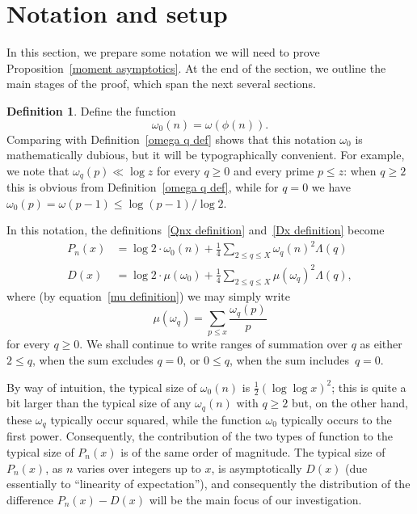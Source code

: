 \documentclass[12pt,reqno]{amsart}
\theoremstyle{definition}
\newtheorem{definition}[theorem]{Definition}
\begin{document}
\section{Notation and setup}\label{notation and setup}

In this section, we prepare some notation we will need to prove Proposition~\ref{moment asymptotics}. At the end of the section, we outline the main stages of the proof, which span the next several sections.

\begin{definition}  \label{omega0 def}
Define the function
\[
\omega_0(n) = \omega(\phi(n)).
\]
Comparing with Definition~\ref{omega q def} shows that this notation $\omega_0$ is mathematically dubious, but it will be typographically convenient. For example, we note that $\omega_q(p) \ll \log z$ for every $q\ge0$ and every prime $p\le z$: when $q\ge2$ this is obvious from Definition~\ref{omega q def}, while for $q=0$ we have $\omega_0(p) = \omega(p-1) \le \log(p-1)/\log 2$.

In this notation, the definitions~\eqref{Qnx definition} and~\eqref{Dx definition} become
\begin{equation} \label{Pn D new notation}
\begin{split}
P_n(x) &= \log 2 \cdot \omega_0(n) + \frac14 \sum_{2\le q\le X} \omega_{q}(n)^2 \Lambda(q) \\
D(x) &= \log 2 \cdot \mu(\omega_0) + \frac{1}{4}\sum_{2\le q \leq X} \mu(\omega_q)^2 \Lambda(q),
\end{split}
\end{equation}
where (by equation~\eqref{mu definition}) we may simply write
\[
\mu(\omega_q) = \sum_{p \leq x} \frac{\omega_q(p)}{p}
\]
for every $q\ge0$. We shall continue to write ranges of summation over $q$ as either $2\le q$, when the sum excludes $q=0$, or $0\le q$, when the sum includes~$q=0$.
\end{definition}

By way of intuition, the typical size of $\omega_0(n)$ is $\frac12(\log\log x)^2$; this is quite a bit larger than the typical size of any $\omega_q(n)$ with $q\ge2$ but, on the other hand, these $\omega_q$ typically occur squared, while the function $\omega_0$ typically occurs to the first power. Consequently, the contribution of the two types of function to the typical size of $P_n(x)$ is of the same order of magnitude. The typical size of $P_n(x)$, as $n$ varies over integers up to $x$, is asymptotically $D(x)$ (due essentially to ``linearity of expectation''), and consequently the distribution of the difference $P_n(x)-D(x)$ will be the main focus of our investigation.
\end{document}
